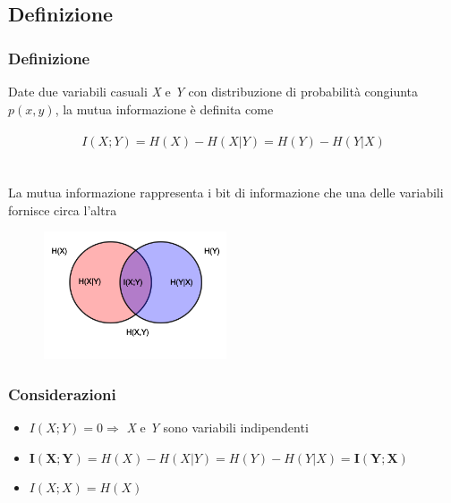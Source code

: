 \documentclass{beamer}
\begin{document}
\subsection{Definizione}
\begin{frame}
	\frametitle{Definizione}
		\nocite{Ding:2003:MRF:937976.938050}
		\nocite{Peng05featureselection}
Date due variabili casuali \emph{X} e \emph{Y} con distribuzione di probabilità congiunta $p(x, y)$, la mutua
informazione è definita come \\~$$I(X; Y ) = H(X) − H(X|Y ) = H(Y ) − H(Y |X)$$\\~\\
La mutua informazione rappresenta i bit di informazione che una delle variabili fornisce circa l'altra
\begin{figure}[htb]
	\vspace{-0.2cm}
	\includegraphics[width=0.48\textwidth]{figure/mutual.png}
\end{figure}
\end{frame}
\begin{frame}
	\frametitle{Considerazioni}
	\begin{itemize}
		\item $I(X;Y)=0 \Rightarrow$ \emph{X} e \emph{Y} sono variabili indipendenti
		\item $\pmb{I(X;Y)} = H(X)-H(X|Y)=H(Y)-H(Y|X)= \pmb{I(Y;X)}$
		\item $I(X;X)=H(X)$
	\end{itemize}
\end{frame}
\end{document}
